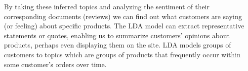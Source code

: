 \documentclass[a4paper,11pt]{article}
\begin{document}
    By taking these inferred topics and analyzing the sentiment of their
corresponding documents (reviews) we can find out what customers are
saying (or feeling) about specific products. The LDA model can extract
representative statements or quotes, enabling us to summarize customers'
opinions about products, perhaps even displaying them on the site. LDA
models groups of customers to topics which are groups of products that
frequently occur within some customer's orders over time.
        
    \begin{center}
    \end{center}
    
    \begin{center}
    \end{center}

    


    
    
    
    
\end{document}
